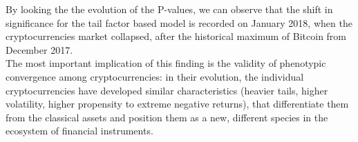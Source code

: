  By looking the the evolution of the P-values, we can observe that the shift in significance for the tail factor based model is recorded on January 2018, when the cryptocurrencies market collapsed, after the historical maximum of Bitcoin from December 2017.\\ 
 \indent{}The most important implication of this finding is the validity of phenotypic convergence among cryptocurrencies: in their evolution, the individual cryptocurrencies have developed similar characteristics (heavier tails, higher volatility, higher propensity to extreme negative returns), that differentiate them from the classical assets and position them as a new, different species in the ecosystem of financial instruments.